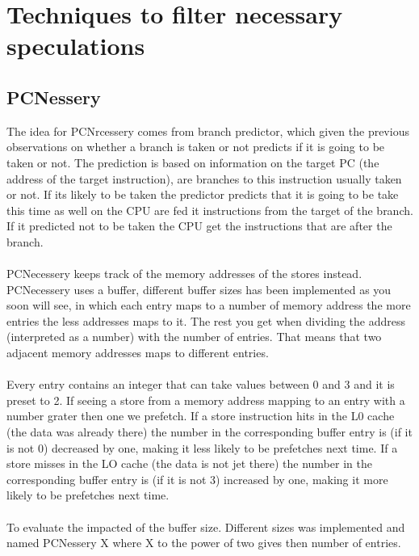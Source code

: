 \section{Techniques to filter necessary speculations} 
 \subsection{PCNessery}
The idea for PCNrcessery comes from branch predictor, which given the previous observations on whether a branch is taken or not predicts if it is going to be taken or not. The prediction is based on information on the target PC (the address of the target instruction), are branches to this instruction usually taken or not. If its likely to be taken the predictor predicts that it is going to be take this time as well on the CPU are fed it instructions from the target of the branch. If it predicted not to be taken the CPU get the instructions that are after the branch. \\ \\
PCNecessery keeps track of the memory addresses of the stores instead. PCNecessery uses a buffer, different buffer sizes has been implemented as you soon will see, in which each entry maps to a number of memory address the more entries the less addresses maps to it. The rest you get when dividing the address (interpreted as a number) with the number of entries. That means that two adjacent memory addresses maps to different entries.\\ \\


Every entry contains an integer that can take values between 0 and 3 and it is preset to 2. If seeing a store from a memory address mapping to an entry with a number grater then one we prefetch. If a store instruction hits in the L0 cache (the data was already there) the number in the corresponding buffer entry is (if it is not 0) decreased by one, making it less likely to be prefetches next time. If a store misses in the LO cache (the data is not jet there) the number in the  corresponding buffer entry is (if it is not 3) increased by one, making it more likely to be prefetches next time. \\ \\


To evaluate the impacted of the buffer size. Different sizes was implemented and named PCNessery X where X to the power of two gives then number of entries.
